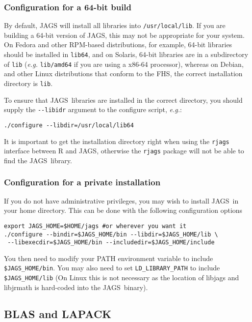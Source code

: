 \documentclass[11pt, a4paper, titlepage]{article}
\newcommand{\JAGS}{\textsf{JAGS}}
\begin{document}
\subsubsection{Configuration for a 64-bit build}

By default, JAGS will install all libraries into
\verb+/usr/local/lib+.  If you are building a 64-bit version of \JAGS,
this may not be appropriate for your system. On Fedora and other
RPM-based distributions, for example, 64-bit libraries should be
installed in \verb+lib64+, and on Solaris, 64-bit libraries are in a
subdirectory of \verb+lib+ ({\em e.g.} \verb+lib/amd64+ if you are
using a x86-64 processor), whereas on Debian, and other Linux
distributions that conform to the FHS, the correct installation
directory is \verb+lib+.

To ensure that \JAGS\ libraries are installed in the correct
directory, you should supply the \verb+--libidr+ argument to the
configure script, {\em e.g.}:
\begin{verbatim}
./configure --libdir=/usr/local/lib64
\end{verbatim}

It is important to get the installation directory right when using the
\texttt{rjags} interface between R and \JAGS, otherwise the
\texttt{rjags} package will not be able to find the \JAGS\ library.

\subsubsection{Configuration for a private installation}

If you do not have administrative privileges, you may wish to install
\JAGS\ in your home directory. This can be done with the following
configuration options
\begin{verbatim}
export JAGS_HOME=$HOME/jags #or wherever you want it
./configure --bindir=$JAGS_HOME/bin --libdir=$JAGS_HOME/lib \
 --libexecdir=$JAGS_HOME/bin --includedir=$JAGS_HOME/include
\end{verbatim}
You then need to modify your PATH environment variable to include
\verb+$JAGS_HOME/bin+. You may also need to set \verb+LD_LIBRARY_PATH+
to include \verb+$JAGS_HOME/lib+ (On Linux this is not necessary as
the location of libjags and libjrmath is hard-coded into the
\JAGS\ binary).

\subsection{BLAS and LAPACK}
\label{section:blas:lapack}
\end{document}
